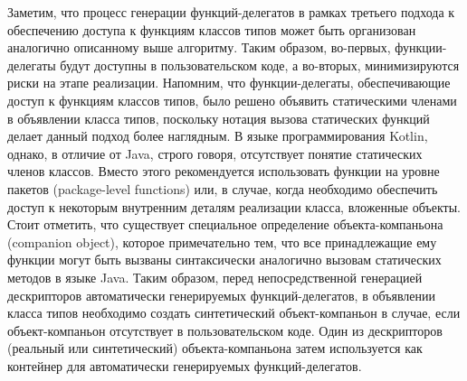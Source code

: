 Заметим, что процесс генерации функций-делегатов в рамках третьего подхода к обеспечению доступа к функциям классов типов может быть организован аналогично описанному выше алгоритму. Таким образом, во-первых, функции-делегаты будут доступны в пользовательском коде, а во-вторых, минимизируются риски на этапе реализации. Напомним, что функции-делегаты, обеспечивающие доступ к функциям классов типов, было решено объявить статическими членами в объявлении класса типов, поскольку нотация вызова статических функций делает данный подход более наглядным. В языке программирования Kotlin, однако, в отличие от Java, строго говоря, отсутствует понятие статических членов классов. Вместо этого рекомендуется использовать функции на уровне пакетов (package-level functions) или, в случае, когда необходимо обеспечить доступ к некоторым внутренним деталям реализации класса, вложенные объекты. Стоит отметить, что существует специальное определение объекта-компаньона (companion object), которое примечательно тем, что все принадлежащие ему функции могут быть вызваны синтаксически аналогично вызовам статических методов в языке Java. Таким образом, перед непосредственной генерацией дескрипторов автоматически генерируемых функций-делегатов, в объявлении класса типов необходимо создать синтетический объект-компаньон в случае, если объект-компаньон отсутствует в пользовательском коде. Один из дескрипторов (реальный или синтетический) объекта-компаньона затем используется как контейнер для автоматически генерируемых функций-делегатов.


